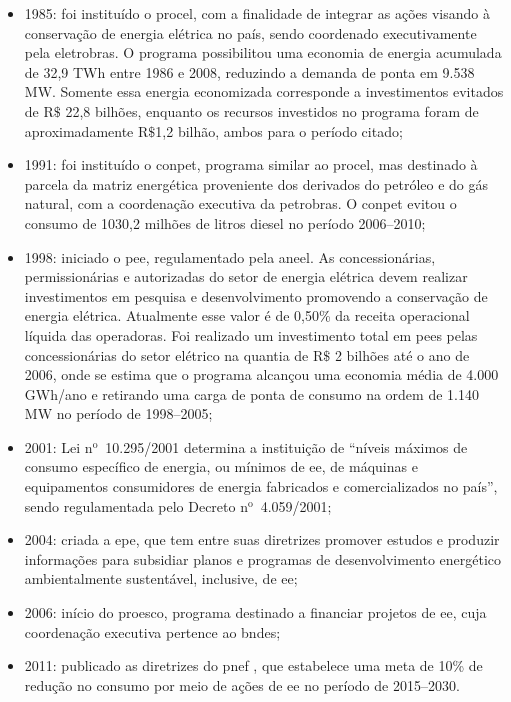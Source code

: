 \begin{itemize}
\item 1985: foi instituído o \gls{procel}, com a finalidade de
integrar as ações visando à conservação de energia elétrica no país,
sendo coordenado executivamente pela \acs{eletrobras}. O programa
possibilitou uma economia de energia acumulada de 32,9 TWh entre 1986
e 2008, reduzindo a demanda de ponta em 9.538 MW. Somente essa energia
economizada corresponde a investimentos evitados de $\text{R\$}$ 22,8
bilhões, enquanto os recursos investidos no programa foram de
aproximadamente $\text{R\$}$1,2 bilhão, ambos para o período citado;
\item 1991: foi instituído o \gls{conpet}, programa similar ao
\gls{procel}, mas destinado à parcela da matriz energética proveniente
dos derivados do petróleo e do gás natural, com a coordenação
executiva da \acs{petrobras}. O \gls{conpet} evitou o consumo de
1030,2 milhões de litros diesel no período 2006--2010;
\item 1998: iniciado o \gls{pee}, regulamentado pela \gls{aneel}. As
concessionárias, permissionárias e autorizadas do setor de energia
elétrica devem realizar investimentos em pesquisa e desenvolvimento
promovendo a conservação de energia elétrica.  Atualmente esse valor é
de 0,50\% da receita operacional líquida das operadoras.  Foi
realizado um investimento total em \glspl{pee} pelas concessionárias
do setor elétrico na quantia de $\text{R\$}$ 2 bilhões até o ano de
2006, onde se estima que o programa alcançou uma economia média de
4.000 GWh/ano e retirando uma carga de ponta de consumo na ordem de
1.140 MW no período de 1998--2005;
\item 2001: Lei n$^\text{o}$~10.295/2001 determina a instituição de
``níveis máximos de consumo específico de energia, ou mínimos de
\gls{ee}, de máquinas e equipamentos consumidores de energia fabricados e
comercializados no país'', sendo regulamentada pelo Decreto
n$^\text{o}$~4.059/2001;
\item 2004: criada a \gls{epe}, que tem entre suas diretrizes promover
estudos e produzir informações para subsidiar planos e programas de
desenvolvimento energético ambientalmente sustentável, inclusive, de
\gls{ee};
\item 2006: início do \gls{proesco}, programa destinado a financiar
projetos de \gls{ee}, cuja coordenação executiva pertence ao
\gls{bndes};
\item 2011: publicado as diretrizes do \gls{pnef} \cite{pnef}, que
estabelece uma meta de 10\% de redução no consumo por meio de ações de
\gls{ee} no período de 2015--2030.
\end{itemize}

